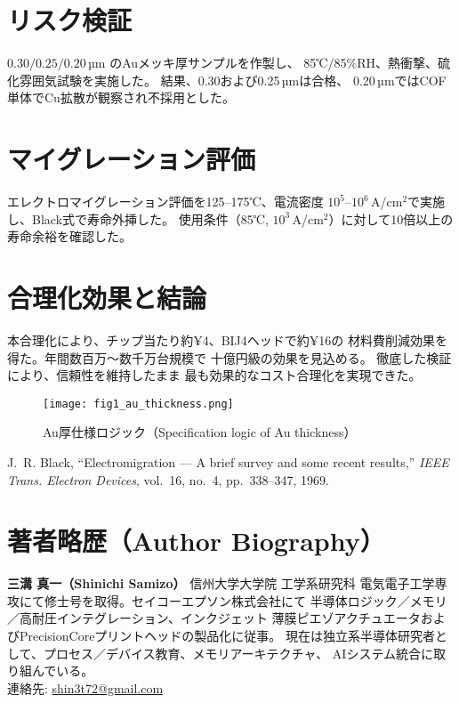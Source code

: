 \documentclass[conference]{IEEEtran}
\begin{document}
\section{リスク検証}
$0.30/0.25/0.20$\,µm のAuメッキ厚サンプルを作製し、
85℃/85\%RH、熱衝撃、硫化雰囲気試験を実施した。
結果、0.30および0.25\,µmは合格、
0.20\,µmではCOF単体でCu拡散が観察され不採用とした。

\section{マイグレーション評価}
エレクトロマイグレーション評価を125--175℃、電流密度
$10^5$--$10^6$\,A/cm$^2$で実施し、Black式で寿命外挿した。
使用条件（85℃, $10^3$\,A/cm$^2$）に対して10倍以上の寿命余裕を確認した。

\section{合理化効果と結論}
本合理化により、チップ当たり約¥4、BIJ4ヘッドで約¥16の
材料費削減効果を得た。年間数百万〜数千万台規模で
十億円級の効果を見込める。
徹底した検証により、信頼性を維持したまま
最も効果的なコスト合理化を実現できた。

\begin{figure}[htbp]
  \centering
  \texttt{[image: fig1\_au\_thickness.png]}
  \caption{Au厚仕様ロジック（Specification logic of Au thickness）}
  \label{fig:au}
\end{figure}


\begin{thebibliography}{1}
J.~R. Black, ``Electromigration --- A brief survey and some recent results,''
\emph{IEEE Trans. Electron Devices}, vol.~16, no.~4, pp.~338--347, 1969.
\end{thebibliography}

\section*{著者略歴（Author Biography）}
\textbf{三溝 真一（Shinichi Samizo）} 信州大学大学院 工学系研究科
電気電子工学専攻にて修士号を取得。セイコーエプソン株式会社にて
半導体ロジック／メモリ／高耐圧インテグレーション、インクジェット
薄膜ピエゾアクチュエータおよびPrecisionCoreプリントヘッドの製品化に従事。
現在は独立系半導体研究者として、プロセス／デバイス教育、メモリアーキテクチャ、
AIシステム統合に取り組んでいる。\\
連絡先: \href{mailto:shin3t72@gmail.com}{shin3t72@gmail.com}
\end{document}
